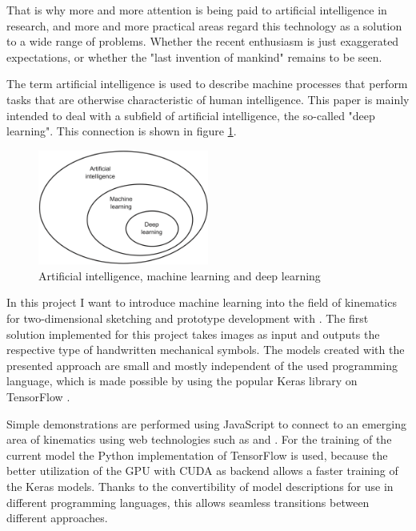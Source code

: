 That is why more and more attention is being paid to artificial intelligence in research, and more and more practical areas regard this technology as a solution to a wide range of problems.
Whether the recent enthusiasm is just exaggerated expectations, or whether the "last invention of mankind" \cite{Good1965} remains to be seen.

The term artificial intelligence is used to describe machine processes that perform tasks that are otherwise characteristic of human intelligence.
This paper is mainly intended to deal with a subfield of artificial intelligence, the so-called "deep learning".
This connection is shown in figure \ref{fig:ai_ml_dl}.

\begin{figure}
    \includegraphics[width=0.5\textwidth]{images/ai_ml_dl.png}
    \caption[AI, ML and DL]{Artificial intelligence, machine learning and deep learning \cite[p.4]{Chollet2017}}
    \label{fig:ai_ml_dl}
\end{figure}

In this project I want to introduce machine learning into the field of kinematics for two-dimensional sketching and prototype development with .
The first solution implemented for this project takes images as input and outputs the respective type of handwritten mechanical symbols.
The models created with the presented approach are small and mostly independent of the used programming language, which is made possible by using the popular Keras \cite{Chollet} library on TensorFlow \cite{Google2019}.

Simple demonstrations are performed using JavaScript to connect to an emerging area of kinematics using web technologies such as  \cite{Goessner2019} and  \cite{Uhlig2019}.
For the training of the current model the Python implementation of TensorFlow is used, because the better utilization of the GPU with CUDA \cite{nvidia2019} as backend allows a faster training of the Keras models.
Thanks to the convertibility of model descriptions for use in different programming languages, this allows seamless transitions between different approaches.

